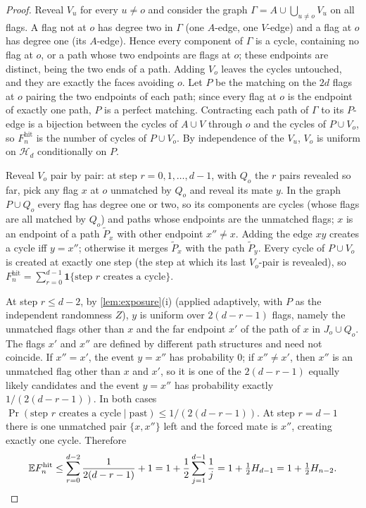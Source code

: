 \documentclass[11pt,a4paper]{article}
\theoremstyle{plain}
\theoremstyle{definition}
\theoremstyle{remark}
\newcommand{\E}{\mathbb E}
\newcommand{\cH}{\mathcal H}
\newcommand{\Fhit}{F_n^{\mathrm{hit}}}
\newcommand{\Ind}{\mathbf 1}
\begin{document}
\label{pf:hit}
\lemhit*
\begin{proof}
Reveal $V_u$ for every $u\ne o$ and consider the graph $\Gamma=A\cup\bigcup_{u\ne o}V_u$ on all flags. A flag not at $o$ has degree two in $\Gamma$ (one $A$-edge, one $V$-edge) and a flag at $o$ has degree one (its $A$-edge). Hence every component of $\Gamma$ is a cycle, containing no flag at $o$, or a path whose two endpoints are flags at $o$; these endpoints are distinct, being the two ends of a path. Adding $V_o$ leaves the cycles untouched, and they are exactly the faces avoiding $o$. Let $P$ be the matching on the $2d$ flags at $o$ pairing the two endpoints of each path; since every flag at $o$ is the endpoint of exactly one path, $P$ is a perfect matching. Contracting each path of $\Gamma$ to its $P$-edge is a bijection between the cycles of $A\cup V$ through $o$ and the cycles of $P\cup V_o$, so $\Fhit$ is the number of cycles of $P\cup V_o$. By independence of the $V_u$, $V_o$ is uniform on $\cH_d$ conditionally on $P$.

Reveal $V_o$ pair by pair: at step $r=0,1,\dots,d-1$, with $Q_o$ the $r$ pairs revealed so far, pick any flag $x$ at $o$ unmatched by $Q_o$ and reveal its mate $y$. In the graph $P\cup Q_o$ every flag has degree one or two, so its components are cycles (whose flags are all matched by $Q_o$) and paths whose endpoints are the unmatched flags; $x$ is an endpoint of a path $\tilde P_x$ with other endpoint $x''\ne x$. Adding the edge $xy$ creates a cycle iff $y=x''$; otherwise it merges $\tilde P_x$ with the path $\tilde P_y$. Every cycle of $P\cup V_o$ is created at exactly one step (the step at which its last $V_o$-pair is revealed), so $\Fhit=\sum_{r=0}^{d-1}\Ind\{\text{step $r$ creates a cycle}\}$.

At step $r\le d-2$, by \cref{lem:exposure}(i) (applied adaptively, with $P$ as the independent randomness $Z$), $y$ is uniform over $2(d-r-1)$ flags, namely the unmatched flags other than $x$ and the far endpoint $x'$ of the path of $x$ in $J_o\cup Q_o$. The flags $x'$ and $x''$ are defined by different path structures and need not coincide. If $x''=x'$, the event $y=x''$ has probability $0$; if $x''\ne x'$, then $x''$ is an unmatched flag other than $x$ and $x'$, so it is one of the $2(d-r-1)$ equally likely candidates and the event $y=x''$ has probability exactly $1/(2(d-r-1))$. In both cases $\Pr(\text{step $r$ creates a cycle}\mid\text{past})\le1/(2(d-r-1))$. At step $r=d-1$ there is one unmatched pair $\{x,x''\}$ left and the forced mate is $x''$, creating exactly one cycle. Therefore
\[
\E\Fhit\le\sum_{r=0}^{d-2}\frac1{2(d-r-1)}+1=1+\frac12\sum_{j=1}^{d-1}\frac1j=1+\tfrac12H_{d-1}=1+\tfrac12H_{n-2}.\qedhere
\]
\end{proof}
\end{document}
